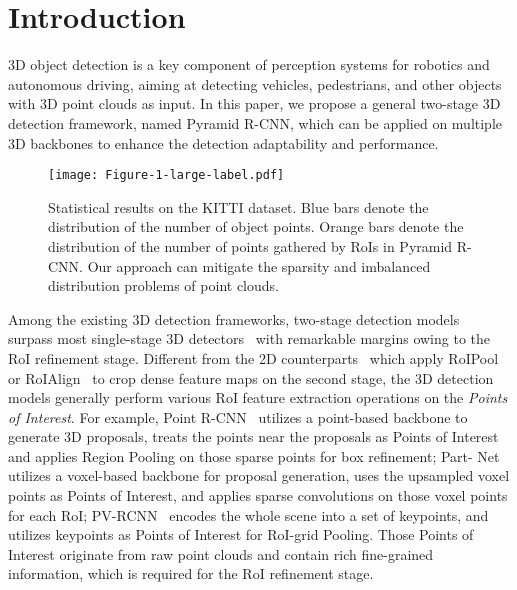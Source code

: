 \documentclass[10pt,twocolumn,letterpaper]{article}
\begin{document}
\section{Introduction}
3D object detection is a key component of perception systems for robotics and autonomous driving, aiming at detecting vehicles, pedestrians, and other objects with 3D point clouds as input. In this paper, we propose a general two-stage 3D detection framework, named Pyramid R-CNN, which can be applied on multiple 3D backbones to enhance the detection adaptability and performance.

\begin{figure}[!t]
\centering
\texttt{[image: Figure-1-large-label.pdf]}
\caption{Statistical results on the KITTI dataset. Blue bars denote the distribution of the number of object points. Orange bars denote the distribution of the number of points gathered by RoIs in Pyramid R-CNN. Our approach can mitigate the sparsity and imbalanced distribution problems of point clouds.}
\label{fig_intro}
\vspace{-6mm}
\end{figure}

Among the existing 3D detection frameworks, two-stage detection models~\cite{yang2019std, shi2020points, shi2020pv, deng2020voxel, shi2021pv} surpass most single-stage 3D detectors~\cite{zhou2018voxelnet, yan2018second, lang2019pointpillars, mao2021one, shi2019pointrcnn} with remarkable margins owing to the RoI refinement stage. Different from the 2D counterparts~\cite{girshick2014rich, girshick2015fast, ren2016faster, he2017mask, cai2018cascade} which apply RoIPool~\cite{girshick2015fast} or RoIAlign~\cite{he2017mask} to crop dense feature maps on the second stage, the 3D detection models generally perform various RoI feature extraction operations on the \textit{Points of Interest}. For example, Point R-CNN~\cite{shi2019pointrcnn} utilizes a point-based backbone to generate 3D proposals, treats the points near the proposals as Points of Interest and applies Region Pooling on those sparse points for box refinement; Part- Net~\cite{shi2020points} utilizes a voxel-based backbone for proposal generation, uses the upsampled voxel points as Points of Interest, and applies sparse convolutions on those voxel points for each RoI; PV-RCNN~\cite{shi2020pv} encodes the whole scene into a set of keypoints, and utilizes keypoints as Points of Interest for RoI-grid Pooling. Those Points of Interest originate from raw point clouds and contain rich fine-grained information, which is required for the RoI refinement stage.
\end{document}
